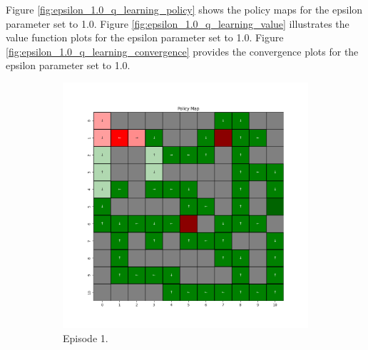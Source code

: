\documentclass{assignment}
\begin{document}
Figure \ref{fig:epsilon_1.0_q_learning_policy} shows the policy maps for the epsilon parameter set to 1.0. Figure \ref{fig:epsilon_1.0_q_learning_value} illustrates the value function plots for the epsilon parameter set to 1.0. Figure \ref{fig:epsilon_1.0_q_learning_convergence} provides the convergence plots for the epsilon parameter set to 1.0.

\begin{figure}[H]
    \begin{subfigure}{0.3\textwidth}
        \includegraphics[width=\textwidth]{figures/policy_q/epsilon_sweep/policy_alpha_0.1_gamma_0.95_epsilon_1.0_iteration_1.png}
    \caption{Episode 1.}
    \end{subfigure}\hfill
    \begin{subfigure}{0.3\textwidth}

\end{subfigure}
\end{figure}
\end{document}
